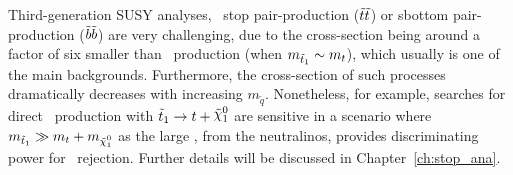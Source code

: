 				Third-generation \ac{SUSY} analyses, \eg\ stop pair-production ($\tilde{t}\tilde{t}$) or sbottom pair-production ($\tilde{b}\tilde{b}$) are very challenging, due to the cross-section being around a factor of six smaller than \ttbar\ production (when $m_{\tilde{t}_1} \sim m_t$), which usually is one of the main backgrounds. Furthermore, the cross-section of such processes dramatically decreases with increasing $m_{\tilde{q}}$. Nonetheless, for example, searches for direct \stopone\ production with $\stopone \ra t + \ninoone$ are sensitive in a scenario where $m_{\stopone} \gg m_t + m_{\ninoone}$ as the large \met, from the neutralinos, provides discriminating power for \ttbar\ rejection. Further details will be discussed in Chapter~\ref{ch:stop_ana}.
				